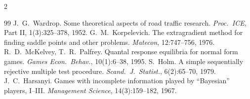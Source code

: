 \documentclass{article}
\begin{document}
\begin{multicols}{2}
\begin{thebibliography}{99}
 J.~G.~Wardrop. Some theoretical aspects of road traffic research. \emph{Proc.\ ICE}, Part II, 1(3):325--378, 1952.
 G.~M.~Korpelevich. The extragradient method for finding saddle points and other problems. \emph{Matecon}, 12:747--756, 1976.
 R.~D.~McKelvey, T.~R.~Palfrey. Quantal response equilibria for normal form games. \emph{Games Econ.\ Behav.}, 10(1):6--38, 1995.
 S.~Holm. A simple sequentially rejective multiple test procedure. \emph{Scand.\ J.\ Statist.}, 6(2):65--70, 1979.
 J.~C.~Harsanyi. Games with incomplete information played by ``Bayesian'' players, I--III. \emph{Management Science}, 14(3):159--182, 1967.
\end{thebibliography}\let\section\origsection\end{multicols}
\end{document}
